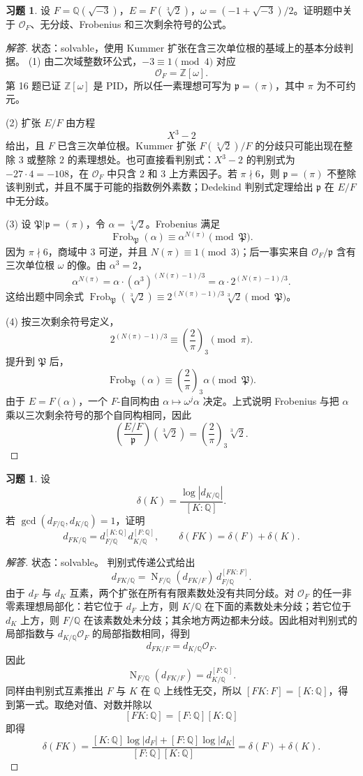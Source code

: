 \documentclass[11pt,a4paper,openany]{ctexbook}
\numberwithin{equation}{chapter}
\newcommand{\Q}{\mathbb{Q}}
\newcommand{\Z}{\mathbb{Z}}
\newcommand{\OF}{\mathcal{O}_F}
\newcommand{\Nm}{\operatorname{N}}
\newcommand{\Frob}{\operatorname{Frob}}
\theoremstyle{plain}
\theoremstyle{definition}
\newtheorem{exercise}[theorem]{习题}
\theoremstyle{remark}
\begin{document}
\begin{exercise}
设 $F=\Q(\sqrt{-3})$，$E=F(\sqrt[3]{2})$，$\omega=(-1+\sqrt{-3})/2$。证明题中关于 $\OF$、无分歧、Frobenius 和三次剩余符号的公式。
\end{exercise}

\begin{proof}[解答]
状态：solvable，使用 Kummer 扩张在含三次单位根的基域上的基本分歧判据。
(1) 由二次域整数环公式，$-3\equiv1\pmod4$ 对应
\[
\OF=\Z[\omega].
\]
第 16 题已证 $\Z[\omega]$ 是 PID，所以任一素理想可写为 $\mathfrak p=(\pi)$，其中 $\pi$ 为不可约元。

(2) 扩张 $E/F$ 由方程
\[
X^3-2
\]
给出，且 $F$ 已含三次单位根。Kummer 扩张 $F(\sqrt[3]{2})/F$ 的分歧只可能出现在整除 $3$ 或整除 $2$ 的素理想处。也可直接看判别式：$X^3-2$ 的判别式为
$-27\cdot4=-108$，在 $\OF$ 中只含 $2$ 和 $3$ 上方素因子。若
$\pi\nmid6$，则 $\mathfrak p=(\pi)$ 不整除该判别式，并且不属于可能的指数例外素数；Dedekind 判别式定理给出 $\mathfrak p$ 在 $E/F$ 中无分歧。

(3) 设 $\mathfrak P|\mathfrak p=(\pi)$，令 $\alpha=\sqrt[3]{2}$。Frobenius 满足
\[
\Frob_{\mathfrak P}(\alpha)\equiv \alpha^{N(\pi)}\pmod{\mathfrak P}.
\]
因为 $\pi\nmid6$，商域中 $3$ 可逆，并且 $N(\pi)\equiv1\pmod3$；后一事实来自
$\OF/\mathfrak p$ 含有三次单位根 $\omega$ 的像。由 $\alpha^3=2$，
\[
\alpha^{N(\pi)}
=\alpha\cdot(\alpha^3)^{(N(\pi)-1)/3}
=\alpha\cdot2^{(N(\pi)-1)/3}.
\]
这给出题中同余式
$\Frob_{\mathfrak P}(\sqrt[3]{2})\equiv
2^{(N(\pi)-1)/3}\sqrt[3]{2}\pmod{\mathfrak P}$。

(4) 按三次剩余符号定义，
\[
2^{(N(\pi)-1)/3}\equiv
\left(\frac2\pi\right)_3
\pmod\pi.
\]
提升到 $\mathfrak P$ 后，
\[
\Frob_{\mathfrak P}(\alpha)
\equiv
\left(\frac2\pi\right)_3\alpha
\pmod{\mathfrak P}.
\]
由于 $E=F(\alpha)$，一个 $F$-自同构由 $\alpha\mapsto\omega^j\alpha$ 决定。上式说明 Frobenius 与把 $\alpha$ 乘以三次剩余符号的那个自同构相同，因此
\[
\left(\frac{E/F}{\mathfrak p}\right)(\sqrt[3]{2})
=\left(\frac2\pi\right)_3\sqrt[3]{2}.
\]
\end{proof}

\begin{exercise}
设
\[
\delta(K)=\frac{\log|d_{K/\Q}|}{[K:\Q]}.
\]
若 $\gcd(d_{F/\Q},d_{K/\Q})=1$，证明
\[
d_{FK/\Q}=d_{F/\Q}^{[K:\Q]}d_{K/\Q}^{[F:\Q]},
\qquad
\delta(FK)=\delta(F)+\delta(K).
\]
\end{exercise}

\begin{proof}[解答]
状态：solvable。
判别式传递公式给出
\[
d_{FK/\Q}
=\Nm_{F/\Q}(d_{FK/F})\,d_{F/\Q}^{[FK:F]}.
\]
由于 $d_F$ 与 $d_K$ 互素，两个扩张在所有有限素数处没有共同分歧。对 $\mathcal O_F$ 的任一非零素理想局部化：若它位于 $d_F$ 上方，则 $K/\Q$ 在下面的素数处未分歧；若它位于 $d_K$ 上方，则 $F/\Q$ 在该素数处未分歧；其余地方两边都未分歧。因此相对判别式的局部指数与 $d_{K/\Q}\mathcal O_F$ 的局部指数相同，得到
\[
d_{FK/F}=d_{K/\Q}\mathcal O_F.
\]
因此
\[
\Nm_{F/\Q}(d_{FK/F})=d_{K/\Q}^{[F:\Q]}.
\]
同样由判别式互素推出 $F$ 与 $K$ 在 $\Q$ 上线性无交，所以 $[FK:F]=[K:\Q]$，得到第一式。取绝对值、对数并除以
\[
[FK:\Q]=[F:\Q][K:\Q]
\]
即得
\[
\delta(FK)
=\frac{[K:\Q]\log|d_F|+[F:\Q]\log|d_K|}
{[F:\Q][K:\Q]}
=\delta(F)+\delta(K).
\]
\end{proof}
\end{document}
